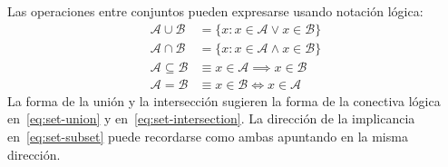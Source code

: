   Las operaciones entre conjuntos
  pueden expresarse usando notación lógica:%
  \begin{align}
    \mathcal{A} \cup \mathcal{B}
      &= \{x \colon x \in \mathcal{A} \vee x \in \mathcal{B}\}
	  \label{eq:set-union} \\
    \mathcal{A} \cap \mathcal{B}
      &= \{x \colon x \in \mathcal{A} \wedge x \in \mathcal{B}\}
	  \label{eq:set-intersection} \\
    \mathcal{A} \subseteq \mathcal{B}
      &\equiv x \in \mathcal{A} \implies x \in \mathcal{B}
	  \label{eq:set-subset} \\
    \mathcal{A} = \mathcal{B}
      &\equiv x \in \mathcal{B} \iff x \in \mathcal{A}
	  \label{eq:set-equals}
  \end{align}
  La forma de la unión y la intersección
  sugieren la forma de la conectiva lógica
  en~\eqref{eq:set-union} y en~\eqref{eq:set-intersection}.
  La dirección de la implicancia en~\eqref{eq:set-subset}
  puede recordarse como ambas apuntando en la misma dirección.

